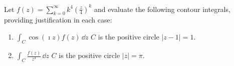 {\begin{Exercise}
  Let $f(z) = \sum_{k=0}^\infty k^4 \left( \frac{z}{4} \right)^k$ and evaluate
  the following contour integrals, providing justification in each case:
  \begin{enumerate}
  \item 
    $\displaystyle \int_C \cos(\imath z) f(z)\,\dd z$
    \quad $C$ is the positive circle $|z - 1| = 1$.
  \item 
    $\displaystyle \int_C \frac{f(z)}{z^3}\,\dd z$
    \quad $C$ is the positive circle $|z| = \pi$.
  \end{enumerate}
\end{Exercise}










\raggedbottom
}
